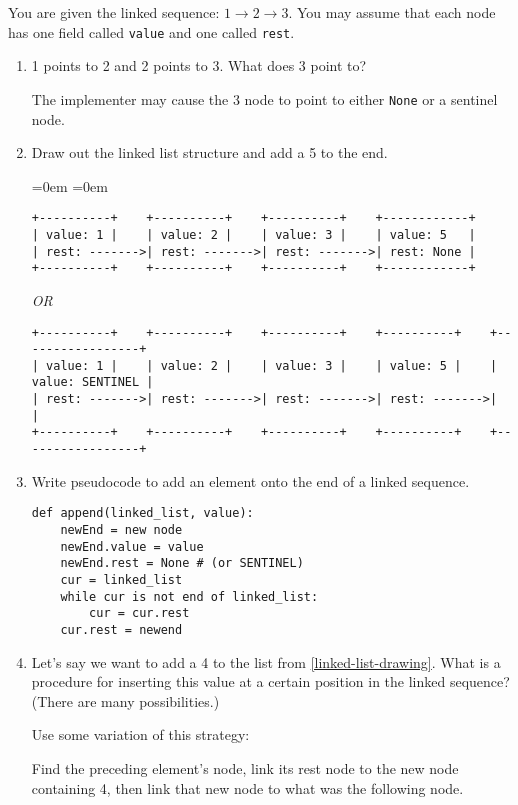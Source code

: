 %
%


You are given the linked sequence: $1 \rightarrow 2 \rightarrow 3$.  You may assume that each node has one field called \texttt{value} and one called \texttt{rest}.
        \begin{enumerate}
            \item 1 points to 2 and 2 points to 3. What does 3 point to? \\
                \begin{answer}
				The implementer may cause the 3 node to point to either \texttt{None} or a sentinel node.
				\end{answer}
            \item \label{linked-list-drawing} Draw out the linked list structure and add a 5 to the end.
				\begin{answer}
				\leftmargin=0em
				\itemindent=0em
				{ \small
				\begin{verbatim}
+----------+    +----------+    +----------+    +------------+
| value: 1 |    | value: 2 |    | value: 3 |    | value: 5   |
| rest: ------->| rest: ------->| rest: ------->| rest: None |
+----------+    +----------+    +----------+    +------------+
				\end{verbatim}
				\textit{OR}
				\begin{verbatim}
+----------+    +----------+    +----------+    +----------+    +-----------------+
| value: 1 |    | value: 2 |    | value: 3 |    | value: 5 |    | value: SENTINEL |
| rest: ------->| rest: ------->| rest: ------->| rest: ------->|                 |
+----------+    +----------+    +----------+    +----------+    +-----------------+
				\end{verbatim} }
				\end{answer}
            \item Write pseudocode to add an element onto the end of a linked sequence.
				\begin{answer}
				\begin{lstlisting}[numbers=none]
def append(linked_list, value):
	newEnd = new node
	newEnd.value = value
	newEnd.rest = None # (or SENTINEL)
	cur = linked_list
	while cur is not end of linked_list:
		cur = cur.rest
	cur.rest = newend
				\end{lstlisting}
				\end{answer}
				\vspace{1in}
            \item Let's say we want to add a 4 to the list from \ref{linked-list-drawing}.
				What is a procedure for inserting this value at a certain position in the linked sequence?
				(There are many possibilities.) \\
                \begin{answer}
				Use some variation of this strategy:

				Find the preceding element's node, link its rest node to the new node containing 4,
				then link that new node to what was the following node.
				\end{answer}
				\vspace{.25in}
        \end{enumerate}
